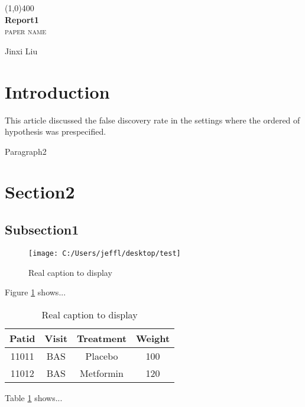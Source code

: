\documentclass{article}
\begin{document}
\begin{titlepage}
	\begin{center}
		\line(1,0){400}\\
		[3mm]
		\huge{\bfseries Report1}\\
		[3mm]
		\textsc{\LARGE paper name }\\
		[10cm]
			
	\end{center}
     
     \begin{flushright}
     \LARGE{Jinxi Liu}
     \end{flushright}
     
\end{titlepage}
	
\tableofcontents
\cleardoublepage

\listoffigures
{}
\cleardoublepage

\listoftables
{}
\cleardoublepage

\section{Introduction}\label{section1}
\par
This article discussed the false discovery rate in the settings where the ordered of hypothesis was prespecified. 


Paragraph2
\newpage
\section{Section2}

\subsection{Subsection1}

\begin{figure}[H]
		
	 \centering
	 \texttt{[image: C:/Users/jeffl/desktop/test]}
	 \caption[Optional caption]{Real caption to display}
	 \label{fig1}
	 
\end{figure}

Figure \ref{fig1} shows...\\

\vspace{2cm}

\begin{table}[H]
	
	\centering
	\caption{Real caption to display}
	\label{tab1}
	
	\begin{tabular}{c c c c}
		\hline
		\bfseries{Patid} & \bfseries{Visit} & \bfseries{Treatment} & \bfseries{Weight}\\ \hline
		11011 & BAS   & Placebo & 100 \\
		11012 & BAS & Metformin & 120\\
		\hline
	\end{tabular}
	
\end{table}
Table \ref{tab1} shows...
\end{document}
